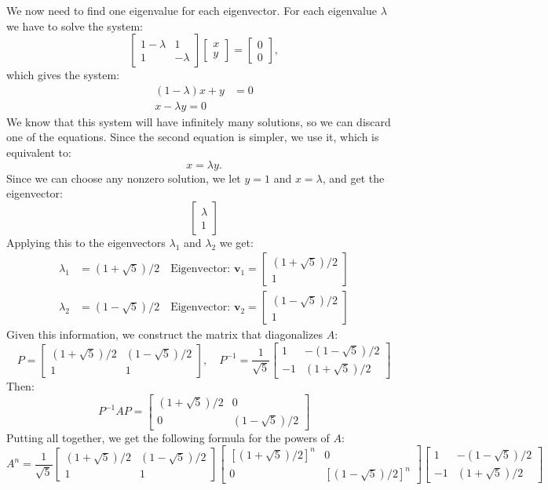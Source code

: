 \documentclass[12pt]{article}
\begin{document}
We now need to find one eigenvalue for each eigenvector. For each eigenvalue $\lambda$ we have to solve the system:
\[
\begin{bmatrix}1-\lambda & 1\\1 & -\lambda\end{bmatrix}
\begin{bmatrix}x\\y\end{bmatrix}=\begin{bmatrix}0\\0\end{bmatrix},
\]
which gives the system:
\begin{align*}
(1-\lambda)x+y&=0\\
x-\lambda y=0
\end{align*}
We know that this system will have infinitely many solutions, so we can discard one of the equations. Since the second equation is simpler, we use it, which is equivalent to:
\[
x=\lambda y.
\]
Since we can choose any nonzero solution, we let $y=1$ and $x=\lambda$, and get the eigenvector:
\[
\begin{bmatrix}\lambda\\1\end{bmatrix}
\]
Applying this to the eigenvectors $\lambda_1$ and $\lambda_2$ we get:
\begin{align*}
\lambda_1&=(1+\sqrt{5})/2\quad\text{Eigenvector: }\mathbf{v}_1=\begin{bmatrix}(1+\sqrt{5})/2\\1\end{bmatrix}\\
\lambda_2&=(1-\sqrt{5})/2\quad\text{Eigenvector: }\mathbf{v}_2=\begin{bmatrix}(1-\sqrt{5})/2\\1\end{bmatrix}
\end{align*}
Given this information, we construct the matrix that diagonalizes $A$:
\[
P=\begin{bmatrix}(1+\sqrt{5})/2&(1-\sqrt{5})/2\\1&1\end{bmatrix},\quad
P^{-1}=\frac{1}{\sqrt{5}}
\begin{bmatrix}1&-(1-\sqrt{5})/2\\-1&(1+\sqrt{5})/2\end{bmatrix}
\]
Then:
\[
P^{-1}AP=\begin{bmatrix}(1+\sqrt{5})/2&0\\0&(1-\sqrt{5})/2\end{bmatrix}
\]
Putting all together, we get the following formula for the powers of $A$:
\[
A^n=
\frac{1}{\sqrt{5}}\begin{bmatrix}(1+\sqrt{5})/2&(1-\sqrt{5})/2\\1&1\end{bmatrix}
\begin{bmatrix}[(1+\sqrt{5})/2]^n&0\\0&[(1-\sqrt{5})/2]^n\end{bmatrix}
\begin{bmatrix}1&-(1-\sqrt{5})/2\\-1&(1+\sqrt{5})/2\end{bmatrix}
\]
\end{document}
